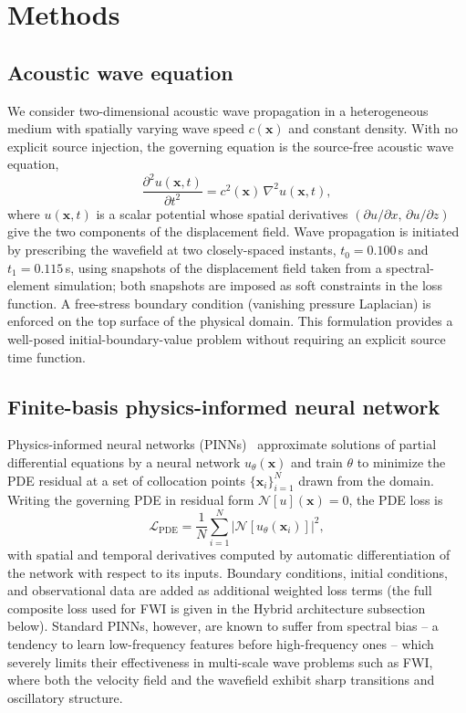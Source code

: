 \documentclass[11pt,a4paper]{article}
\begin{document}
\section{Methods}\label{sec:method}

\subsection{Acoustic wave equation}
\label{sec:methods_wave}

We consider two-dimensional acoustic wave propagation in a heterogeneous medium with spatially varying wave speed $c(\mathbf{x})$ and constant density. With no explicit source injection, the governing equation is the source-free acoustic wave equation,
\begin{equation}
\frac{\partial^{2} u(\mathbf{x},t)}{\partial t^{2}}
= c^{2}(\mathbf{x})\,\nabla^{2} u(\mathbf{x},t),
\label{eq:acoustic_wave}
\end{equation}
where $u(\mathbf{x},t)$ is a scalar potential whose spatial derivatives $(\partial u/\partial x,\, \partial u/\partial z)$ give the two components of the displacement field. Wave propagation is initiated by prescribing the wavefield at two closely-spaced instants, $t_0 = 0.100$\,s and $t_1 = 0.115$\,s, using snapshots of the displacement field taken from a spectral-element simulation; both snapshots are imposed as soft constraints in the loss function. A free-stress boundary condition (vanishing pressure Laplacian) is enforced on the top surface of the physical domain. This formulation provides a well-posed initial-boundary-value problem without requiring an explicit source time function.

\subsection{Finite-basis physics-informed neural network}
\label{sec:methods_fbpinn}

Physics-informed neural networks (PINNs)~\cite{RAISSI2019686} approximate solutions of partial differential equations by a neural network $u_\theta(\mathbf{x})$ and train $\theta$ to minimize the PDE residual at a set of collocation points $\{\mathbf{x}_i\}_{i=1}^{N}$ drawn from the domain. Writing the governing PDE in residual form $\mathcal{N}[u](\mathbf{x}) = 0$, the PDE loss is
\begin{equation}
    \mathcal{L}_\text{PDE}
    = \frac{1}{N} \sum_{i=1}^{N}
    \left| \mathcal{N}[u_\theta(\mathbf{x}_i)] \right|^{2},
\end{equation}
with spatial and temporal derivatives computed by automatic differentiation of the network with respect to its inputs. Boundary conditions, initial conditions, and observational data are added as additional weighted loss terms (the full composite loss used for FWI is given in the Hybrid architecture subsection below). Standard PINNs, however, are known to suffer from spectral bias -- a tendency to learn low-frequency features before high-frequency ones -- which severely limits their effectiveness in multi-scale wave problems such as FWI, where both the velocity field and the wavefield exhibit sharp transitions and oscillatory structure.
\end{document}
